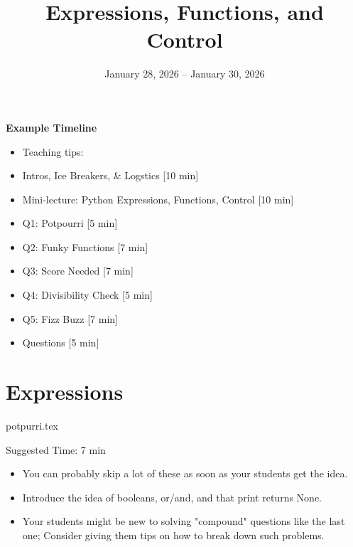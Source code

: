 \documentclass{exam}
\title{Expressions, Functions, and Control}
\date{January 28, 2026 -- January 30, 2026}
\begin{document}
\maketitle

\begin{meta}
    \textbf{Example Timeline}
    \begin{itemize}
        \item Teaching tips:
        
        \item Intros, Ice Breakers, \& Logstics [10 min]
        \item Mini-lecture: Python Expressions, Functions, Control [10 min]
        \item Q1: Potpourri [5 min]
        \item Q2: Funky Functions [7 min]
        \item Q3: Score Needed [7 min]
        \item Q4: Divisibility Check [5 min]
        \item Q5: Fizz Buzz [7 min]
        \item Questions [5 min]
    \end{itemize}
\end{meta}

\section{Expressions}
\begin{questions}
    {potpurri.tex}
    \begin{questionmeta}
        Suggested Time: 7 min
        \begin{itemize}
            \item You can probably skip a lot of these as soon as your students get the idea.
            \item Introduce the idea of booleans, or/and, and that print returns None.
            \item Your students might be new to solving "compound" questions like the last one; Consider giving them tips on how to break down such problems.
        \end{itemize}
    \end{questionmeta}
\end{questions}
\end{document}
